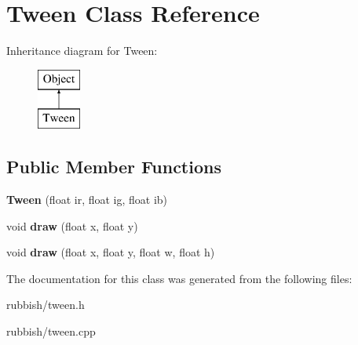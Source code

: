 \hypertarget{class_tween}{\section{Tween Class Reference}
\label{class_tween}
}
Inheritance diagram for Tween\-:\begin{figure}[H]
\begin{center}
\leavevmode
\includegraphics[height=2.000000cm]{class_tween}
\end{center}
\end{figure}
\subsection*{Public Member Functions}
\begin{DoxyCompactItemize}
\item 
\hypertarget{class_tween_aabf46e53623cc19ca44dfb5363b7d389}{{\bfseries Tween} (float ir, float ig, float ib)}\label{class_tween_aabf46e53623cc19ca44dfb5363b7d389}

\item 
\hypertarget{class_tween_afde90e795bbf44b815e5550b284b0ef9}{void {\bfseries draw} (float x, float y)}\label{class_tween_afde90e795bbf44b815e5550b284b0ef9}

\item 
\hypertarget{class_tween_a2e1dc18b17def212817a3d6bf77f23ee}{void {\bfseries draw} (float x, float y, float w, float h)}\label{class_tween_a2e1dc18b17def212817a3d6bf77f23ee}

\end{DoxyCompactItemize}


The documentation for this class was generated from the following files\-:\begin{DoxyCompactItemize}
\item 
rubbish/tween.\-h\item 
rubbish/tween.\-cpp\end{DoxyCompactItemize}
